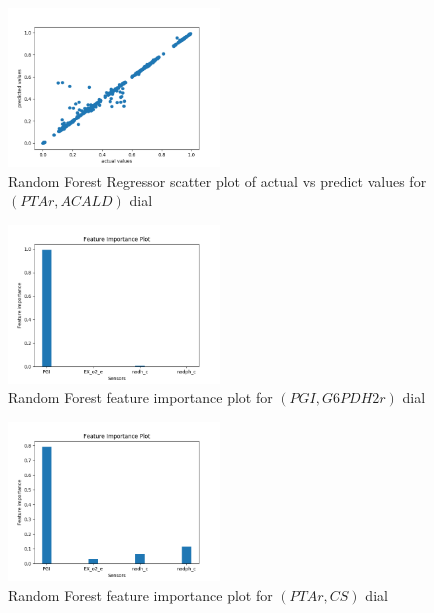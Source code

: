 \documentclass[12pt,chapterheads]{ucsd}
\begin{document}
\begin{figure}[h] 
\centering
\includegraphics[width=0.5\textwidth]{PTAr_ACALD_rfr}
\caption[Random Forest Regressor scatter plot of actual vs predict values for $(PTAr, ACALD)$ dial]
{Random Forest Regressor scatter plot of actual vs predict values for $(PTAr, ACALD)$ dial}
\label{fig:PtarAcaldRfr}
\end{figure}

\begin{figure}[h] 
\centering
\includegraphics[width=0.5\textwidth]{PGI_G6PDH2r_rfr_important_features}
\caption[Random Forest feature importance plot for $(PGI, G6PDH2r)$ dial]
{Random Forest feature importance plot for $(PGI, G6PDH2r)$ dial}
\label{fig:PgiG6pdh2rRfrImp}
\end{figure}

\begin{figure}[h] 
\centering
\includegraphics[width=0.5\textwidth]{PTAr_CS_rfr_important_features}
\caption[Random Forest feature importance plot for $(PTAr, CS)$ dial]
{Random Forest feature importance plot for $(PTAr, CS)$ dial}
\label{fig:PtarCsRfrImp}
\end{figure}
\end{document}
